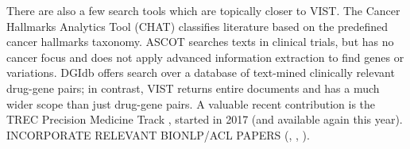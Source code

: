 There are also a few search tools which are topically closer to VIST. The Cancer Hallmarks Analytics Tool (CHAT) \cite{Baker2017} classifies literature based on the predefined cancer hallmarks taxonomy. ASCOT \cite{Korkontzelos2012} searches texts in clinical trials, but has no cancer focus and does not apply advanced information extraction to find genes or variations. DGIdb \cite{Cotto2017} offers search over a database of text-mined clinically relevant drug-gene pairs; in contrast, VIST returns entire documents and has a much wider scope than just drug-gene pairs. A valuable recent contribution is the TREC Precision Medicine Track \cite{Roberts2017}, started in 2017 (and available again this year). INCORPORATE RELEVANT BIONLP/ACL PAPERS (\cite{W18-2313}, \cite{W18-2310}, \cite{seva2018}). 
